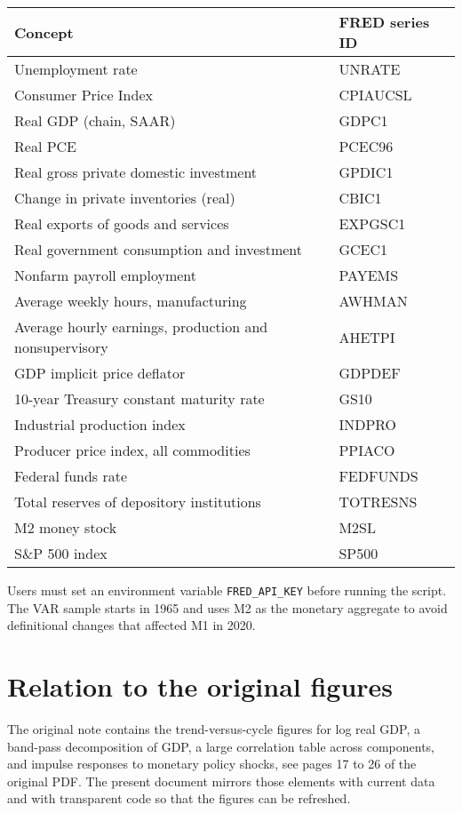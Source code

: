 \documentclass[11pt]{article}
\begin{document}
\begin{center}
\begin{tabular}{ll}
\toprule
Concept & FRED series ID \\
\midrule
Unemployment rate & UNRATE \\
Consumer Price Index & CPIAUCSL \\
Real GDP (chain, SAAR) & GDPC1 \\
Real PCE & PCEC96 \\
Real gross private domestic investment & GPDIC1 \\
Change in private inventories (real) & CBIC1 \\
Real exports of goods and services & EXPGSC1 \\
Real government consumption and investment & GCEC1 \\
Nonfarm payroll employment & PAYEMS \\
Average weekly hours, manufacturing & AWHMAN \\
Average hourly earnings, production and nonsupervisory & AHETPI \\
GDP implicit price deflator & GDPDEF \\
10-year Treasury constant maturity rate & GS10 \\
Industrial production index & INDPRO \\
Producer price index, all commodities & PPIACO \\
Federal funds rate & FEDFUNDS \\
Total reserves of depository institutions & TOTRESNS \\
M2 money stock & M2SL \\
S\&P 500 index & SP500 \\
\bottomrule
\end{tabular}
\end{center}

Users must set an environment variable \texttt{FRED\_API\_KEY} before running the script. The VAR sample starts in 1965 and uses M2 as the monetary aggregate to avoid definitional changes that affected M1 in 2020.

\section{Relation to the original figures}

The original note contains the trend-versus-cycle figures for log real GDP, a band-pass decomposition of GDP, a large correlation table across components, and impulse responses to monetary policy shocks, see pages 17 to 26 of the original PDF. The present document mirrors those elements with current data and with transparent code so that the figures can be refreshed. 
\end{document}

